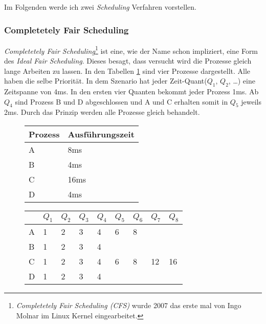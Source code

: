 Im Folgenden werde ich zwei \textit{Scheduling} Verfahren vorstellen.
\newpage
\subsubsection{Completetely Fair Scheduling}
\textit{Completetely Fair Scheduling}\footnote{\textit{Completetely Fair Scheduling (CFS)} wurde 2007 das erste mal von Ingo Molnar im Linux Kernel eingearbeitet.} ist eine, wie der Name schon impliziert, eine Form des \textit{Ideal Fair Scheduling}. Dieses besagt, dass versucht wird die Prozesse gleich lange Arbeiten zu lassen. In den Tabellen \ref{Fair Scheduling} sind vier Prozesse dargestellt. Alle haben die selbe Priorität. In dem Szenario hat jeder Zeit-Quant($Q_1$, $Q_2$, \dots) eine Zeitspanne von 4ms. In den ersten vier Quanten bekommt jeder Prozess 1ms. Ab $Q_4$ sind Prozess B und D abgeschlossen und A und C erhalten somit in $Q_5$ jeweils 2ms. Durch das Prinzip werden alle Prozesse gleich behandelt. \cite{CFS:Rebeiro}
\begin{figure}[h]
    \centering
    \begin{tabular}{| l | l |}
        \hline
        Prozess & Ausführungszeit\\
        \hline
        A & 8ms\\
        \hline
        B & 4ms\\
        \hline
        C & 16ms\\
        \hline
        D & 4ms\\
        \hline
    \end{tabular}
    \begin{tabular}{| x{1em} | x{1em} | x{1em} | x{1em} | x{1em} | x{1em} | x{1em} | x{1em} | x{1em} |}
        \hline
        & $Q_1$ & $Q_2$ & $Q_3$ & $Q_4$ & $Q_5$ & $Q_6$ & $Q_7$ & $Q_8$\\
        \hline
        A & 1 & 2 & 3 & 4 & 6 & 8 & &\\
        \hline
        B & 1 & 2 & 3 & 4 & & & &\\
        \hline
        C & 1 & 2 & 3 & 4 & 6 & 8 & 12 & 16\\
        \hline
        D & 1 & 2 & 3 & 4 & & & &\\
        \hline
    \end{tabular}
    \label{Fair Scheduling}
\end{figure}

